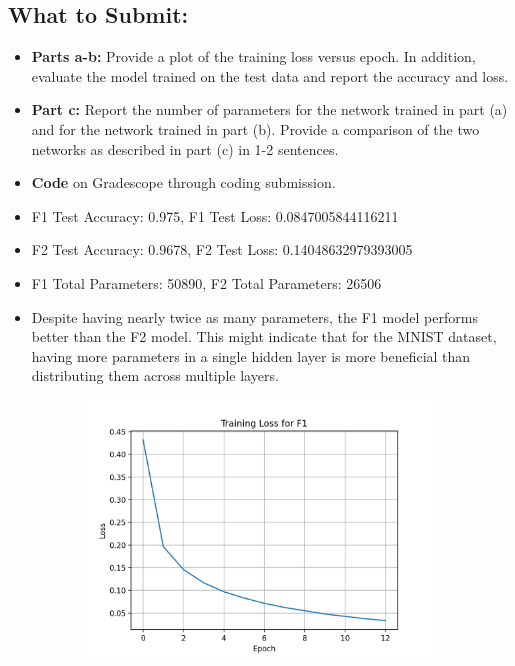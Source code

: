 \documentclass{article}
\begin{document}
\begin{aprob}
    \subsection*{What to Submit:}
    \begin{itemize}
        \item \textbf{Parts a-b:} Provide a plot of the training loss versus epoch. In addition, evaluate the model trained on the test data and report the accuracy and loss.
        \item \textbf{Part c:} Report the number of parameters for the network trained in part (a) and for the network trained in part (b).  Provide a comparison of the two networks as described in part (c) in 1-2 sentences.
        \item \textbf{Code} on Gradescope through coding submission.
    \end{itemize}
    \begin{itemize}
        \item F1 Test Accuracy: 0.975, F1 Test Loss: 0.0847005844116211
        \item F2 Test Accuracy: 0.9678, F2 Test Loss: 0.14048632979393005
        \item F1 Total Parameters: 50890, F2 Total Parameters: 26506
        \item Despite having nearly twice as many parameters, the F1 model performs better than the F2 model. This might indicate that for the MNIST dataset, having more parameters in a single hidden layer is more beneficial than distributing them across multiple layers.
    \end{itemize}
    \begin{figure}[!h]
        \begin{subfigure}{.45\textwidth}
            \centering
            \includegraphics[width=.9\linewidth]{f1.png}

\end{subfigure}
\end{figure}
\end{aprob}
\end{document}
